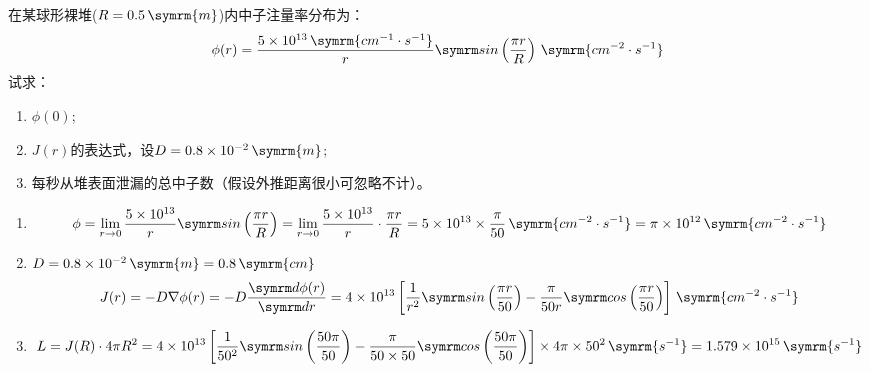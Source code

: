 \begin{exercise}
    在某球形裸堆($R=0.5\,\symrm{m}$)内中子注量率分布为：
    \begin{equation*}
        \phi(r) = \frac{5\times 10^{13}\,\symrm{cm^{-1}\cdot s^{-1}}}{r} \nsin \left(\frac{\pi r}{R}\right)\,\symrm{cm^{-2}\cdot s^{-1}}
    \end{equation*}
    试求：
    \begin{enumerate}[(1)]
        \item $\phi(0)$;
        \item $J(r)$的表达式，设$D = 0.8\times 10^{-2}\,\symrm{m}$;
        \item 每秒从堆表面泄漏的总中子数（假设外推距离很小可忽略不计）。
    \end{enumerate}
    \begin{solution}
        \begin{enumerate}[(1)]
            \item \begin{equation*}
                \phi = \lim_{r\to 0} \frac{5\times 10^{13}}{r} \nsin \left(\frac{\pi r}{R}\right) = \lim_{r\to 0} \frac{5\times 10^{13}}{r} \cdot \frac{\pi r}{R} = 5\times 10^{13} \times \frac{\pi}{50}\,\symrm{cm^{-2}\cdot s^{-1}} = \pi \times 10^{12}\,\symrm{cm^{-2}\cdot s^{-1}}
            \end{equation*}
            \item $D = 0.8\times 10^{-2}\,\symrm{m} = 0.8\,\symrm{cm}$
            \begin{equation*}
                J(r) = -D\nabla \phi(r) = -D \dv{\phi(r)}{r} = 4\times 10^{13} \left[\frac{1}{r^2}\nsin \left(\frac{\pi r}{50}\right) - \frac{\pi}{50 r} \ncos\left(\frac{\pi r}{50}\right)\right]\,\symrm{cm^{-2}\cdot s^{-1}}
            \end{equation*}
            \item \begin{equation*}
                L = J(R)\cdot 4\pi R^2 = 4\times 10^{13} \left[\frac{1}{50^2}\nsin \left(\frac{50 \pi}{50}\right) - \frac{\pi}{50 \times 50} \ncos\left(\frac{50\pi}{50}\right)\right]\times 4\pi\times 50^2 \,\symrm{s^{-1}} = 1.579\times 10^{15}\,\symrm{s^{-1}}
            \end{equation*}
        \end{enumerate}
    \end{solution}
\end{exercise}

